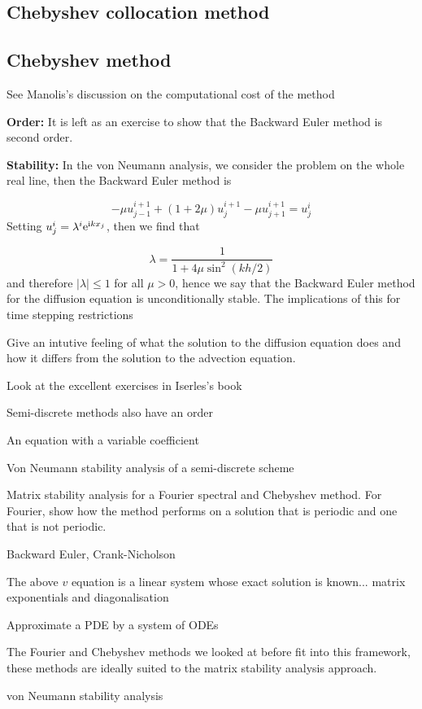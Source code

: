 \documentclass[12pt,a4paper]{article}
\begin{document}
\subsection{Chebyshev collocation method}
\subsection{Chebyshev method}
See Manolis's discussion on the computational cost of the method

\textbf{Order:} It is left as an exercise to show that the Backward Euler method is second order.

\textbf{Stability:} In the von Neumann analysis, we consider the problem on the whole real line, then the Backward Euler method is

\[
-\mu u^{i+1}_{j-1} + (1 + 2\mu)u^{i+1}_j - \mu u^{i+1}_{j+1} = u^{i}_j
\]
Setting $u^{i}_j = \lambda^i {\rm e}^{{\rm i} k x_j}$, then we find that

\[
\lambda = \frac{1}{1 + 4\mu \sin^2(kh/2)}
\]
and therefore $\vert \lambda \vert \leq 1$ for all $\mu > 0$, hence we say that the Backward Euler method for the diffusion equation is unconditionally stable.  The implications of this for time stepping restrictions

Give an intutive feeling of what the solution to the diffusion equation does and how it differs from the solution to the advection equation.

Look at the excellent exercises in Iserles's book

Semi-discrete methods also have an order

An equation with a variable coefficient

Von Neumann stability analysis of a semi-discrete scheme

Matrix stability analysis for a Fourier spectral and Chebyshev method.  For Fourier, show how the method performs on a solution that is periodic and one that is not periodic.

Backward Euler, Crank-Nicholson

The above $v$ equation is a linear system whose exact solution is known... matrix exponentials and diagonalisation

Approximate a PDE by a system of ODEs

The Fourier and Chebyshev methods we looked at before fit into this framework, these methods are ideally suited to the matrix stability analysis approach.

von Neumann stability analysis
\end{document}
